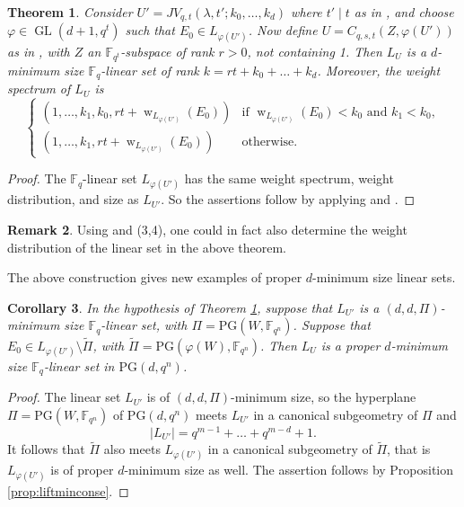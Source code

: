 \documentclass[11pt]{article}
\newtheorem{theorem}{Theorem}[section]
\newtheorem{corollary}[theorem]{Corollary}
\theoremstyle{definition}
\newtheorem{remark}[theorem]{Remark}
\newcommand{\F}{{\mathbb F}}
\newcommand{\fq}{{\mathbb F}_{q}}
\newcommand{\PG}{\mathrm{PG}}
\DeclareMathOperator{\ww}{w}
\DeclareMathOperator{\GL}{GL}
\begin{document}
\begin{theorem} 
 \label{cor:newminimumsizebyqt}
Consider $U' = JV_{q,t}(\lambda,t';k_0, \dots, k_d)$ where $t' \mid t$ as in , and choose $\varphi \in \GL(d+1,q^t)$ such that $E_0 \in L_{\varphi(U')}$.
Now define $U = C_{q,s,t}(Z,\varphi(U'))$ as in , with $Z$ an $\F_{q^t}$-subspace of rank $r>0$, not containing 1.
Then $L_U$ is a $d$-minimum size $\fq$-linear set of rank $k = rt + k_0 + \ldots + k_d$.
Moreover, the weight spectrum of $L_U$ is
\[
\begin{cases}
\left(1,\ldots,k_1,k_0,r t+\ww_{L_{\varphi(U')}}(E_0) \right) & \mbox{if } \ww_{L_{\varphi(U')}}(E_0) < k_0 \text{ and } k_1 < k_0, \\
\left(1,\ldots,k_1,r t+\ww_{L_{\varphi(U')}}(E_0) \right) & \mbox{otherwise}.
\end{cases}
\]
\end{theorem}

\begin{proof}
The $\F_q$-linear set $L_{\varphi(U')}$ has the same weight spectrum, weight distribution, and size as $L_{U'}$.
So the assertions follow by applying  and .
\end{proof}

\begin{remark}
 \label{rk:distributionqt}
Using \cite[Remark 2.19]{Jena2021onlinearsets} and  (3,4), one could in fact also determine the weight distribution of the linear set in the above theorem.
\end{remark}

The above construction gives new examples of proper $d$-minimum size linear sets. 

\begin{corollary}
In the hypothesis of Theorem \ref{cor:newminimumsizebyqt}, suppose that $L_{U'}$ is a $(d,d,\Pi)$-minimum size $\fq$-linear set, with $\Pi=\PG(W,\F_{q^n})$.
Suppose that $E_0 \in L_{\varphi(U')} \setminus \tilde{\Pi}$, with $\tilde{\Pi} = \PG(\varphi(W),\F_{q^n})$.
Then $L_U$ is a proper $d$-minimum size $\F_q$-linear set in $\PG(d,q^n)$. 
\end{corollary}

\begin{proof}
The linear set $L_{U'}$ is of $(d,d,\Pi)$-minimum size, so the hyperplane $\Pi=\PG(W,\F_{q^n})$ of $\PG(d,q^n)$ meets $L_{U'}$ in a canonical subgeometry of $\Pi$ and
\[
\lvert L_{U'} \rvert=q^{m-1}+\ldots+q^{m-d}+1.
\]
It follows that $\tilde{\Pi}$ also meets $L_{\varphi(U')}$ in a canonical subgeometry of $\tilde{\Pi}$, that is $L_{\varphi(U')}$ is of proper $d$-minimum size as well.
The assertion follows by Proposition \ref{prop:liftminconse}. 
\end{proof}
\end{document}
